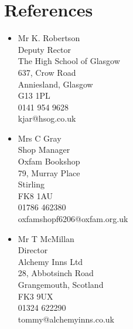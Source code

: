 \documentclass[10pt, a4paper]{article}
\begin{document}
\section{References}
	\begin{multicols*}{2}
		\begin{itemize}
			\item Mr K. Robertson \\ Deputy Rector \\ The High School of Glasgow \\ 637, Crow Road	\\ Anniesland, Glasgow	\\ G13 1PL \\ 0141 954 9628	\\ kjar@hsog.co.uk
			\item Mrs C Gray \\ Shop Manager \\ Oxfam Bookshop \\ 79, Murray Place \\ Stirling \\ FK8 1AU \\ 01786 462380 \\ oxfamshopf6206@oxfam.org.uk
			\item Mr T McMillan \\ Director \\ Alchemy Inns Ltd \\ 28, Abbotsinch Road \\ Grangemouth, Scotland \\ FK3 9UX \\ 01324 622290 \\tommy@alchemyinns.co.uk
		\end{itemize}
	\end{multicols*}
\end{document}
